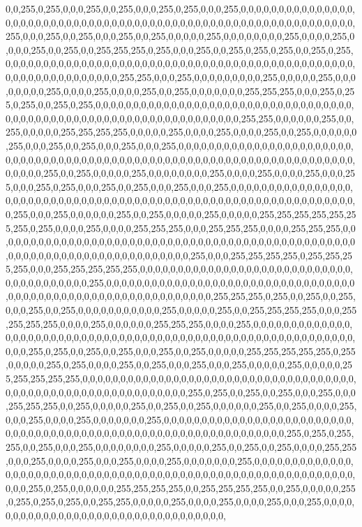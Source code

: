 0,0,255,0,255,0,0,0,255,0,0,255,0,0,0,255,0,255,0,0,0,255,0,0,0,0,0,0,0,0,0,0,0,0,0,0,0,0,0,0,0,0,0,0,0,0,0,0,0,0,0,0,0,0,0,0,0,0,0,0,0,0,0,0,0,0,0,0,0,0,0,0,0,0,0,0,0,0,0,0,0,0,0,255,0,0,0,255,0,0,255,0,0,0,255,0,0,255,0,0,0,0,0,255,0,0,0,0,0,0,0,0,255,0,0,0,0,255,0,0,0,0,255,0,0,255,0,0,255,255,255,0,255,0,0,0,255,0,0,255,0,255,0,255,0,0,255,0,255,0,0,0,0,0,0,0,0,0,0,0,0,0,0,0,0,0,0,0,0,0,0,0,0,0,0,0,0,0,0,0,0,0,0,0,0,0,0,0,0,0,0,0,0,0,0,0,0,0,0,0,0,0,0,0,0,0,0,0,0,0,255,255,0,0,0,255,0,0,0,0,0,0,0,0,0,255,0,0,0,0,0,255,0,0,0,0,0,0,0,0,255,0,0,0,0,255,0,0,0,0,255,0,0,255,0,0,0,0,0,0,0,255,255,255,0,0,0,255,0,255,0,255,0,0,255,0,255,0,0,0,0,0,0,0,0,0,0,0,0,0,0,0,0,0,0,0,0,0,0,0,0,0,0,0,0,0,0,0,0,0,0,0,0,0,0,0,0,0,0,0,0,0,0,0,0,0,0,0,0,0,0,0,0,0,0,0,0,0,0,0,0,0,255,255,0,0,0,0,0,0,255,0,0,255,0,0,0,0,0,255,255,255,255,0,0,0,0,0,255,0,0,0,0,255,0,0,0,0,255,0,0,255,0,0,0,0,0,0,255,0,0,0,255,0,0,255,0,0,0,255,0,0,0,255,0,0,0,0,0,0,0,0,0,0,0,0,0,0,0,0,0,0,0,0,0,0,0,0,0,0,0,0,0,0,0,0,0,0,0,0,0,0,0,0,0,0,0,0,0,0,0,0,0,0,0,0,0,0,0,0,0,0,0,0,0,0,0,0,0,0,0,0,0,0,0,0,0,0,255,0,0,255,0,0,0,0,0,255,0,0,0,0,0,0,0,0,255,0,0,0,0,255,0,0,0,0,255,0,0,0,255,0,0,0,255,0,255,0,0,0,255,0,0,255,0,0,0,255,0,0,0,255,0,0,0,0,0,0,0,0,0,0,0,0,0,0,0,0,0,0,0,0,0,0,0,0,0,0,0,0,0,0,0,0,0,0,0,0,0,0,0,0,0,0,0,0,0,0,0,0,0,0,0,0,0,0,0,0,0,0,0,0,0,0,0,255,0,0,0,255,0,0,0,0,0,0,255,0,0,255,0,0,0,0,0,255,0,0,0,0,0,255,255,255,255,255,255,255,0,255,0,0,0,0,255,0,0,0,0,255,255,255,0,0,0,255,255,255,0,0,0,0,255,255,255,0,0,0,0,0,0,0,0,0,0,0,0,0,0,0,0,0,0,0,0,0,0,0,0,0,0,0,0,0,0,0,0,0,0,0,0,0,0,0,0,0,0,0,0,0,0,0,0,0,0,0,0,0,0,0,0,0,0,0,0,0,0,0,0,0,0,0,0,0,0,0,0,255,0,0,0,255,255,255,255,0,255,255,255,255,0,0,0,255,255,255,255,255,0,0,0,0,0,0,0,0,0,0,0,0,0,0,0,0,0,0,0,0,0,0,0,0,0,0,0,0,0,0,0,0,0,0,0,0,0,0,0,255,0,0,0,0,0,0,0,0,0,0,0,0,0,0,0,0,0,0,0,0,0,0,0,0,0,0,0,0,0,0,0,0,0,0,0,0,0,0,0,0,0,0,0,0,0,0,0,0,0,0,0,0,0,0,0,0,0,0,0,0,255,255,255,0,255,0,0,255,0,0,255,0,0,0,255,0,0,255,0,0,0,0,0,0,0,0,0,0,0,255,0,0,0,0,0,255,0,0,255,255,255,255,0,0,0,255,255,255,255,0,0,0,0,255,0,0,0,0,0,0,255,255,255,0,0,0,0,255,0,0,0,0,0,0,0,0,0,0,0,0,0,0,0,0,0,0,0,0,0,0,0,0,0,0,0,0,0,0,0,0,0,0,0,0,0,0,0,0,0,0,0,0,0,0,0,0,0,0,0,0,0,0,0,0,0,0,0,0,0,0,255,0,255,0,0,255,0,0,255,0,0,0,255,0,0,255,0,0,0,0,0,255,255,255,255,255,0,255,0,0,0,0,0,255,0,255,0,0,0,0,255,0,0,255,0,0,0,255,0,0,0,255,0,0,0,0,0,255,0,0,0,0,0,255,255,255,255,255,0,0,0,0,0,0,0,0,0,0,0,0,0,0,0,0,0,0,0,0,0,0,0,0,0,0,0,0,0,0,0,0,0,0,0,0,0,0,0,0,0,0,0,0,0,0,0,0,0,0,0,0,0,0,0,0,0,0,0,0,255,0,255,0,0,255,0,0,255,0,0,0,255,0,0,0,255,255,255,0,0,255,0,0,0,0,0,255,0,0,255,0,0,255,0,0,0,0,0,0,255,0,0,255,0,0,0,0,255,0,0,0,255,0,0,0,0,255,0,0,0,0,0,0,0,255,0,0,0,0,0,0,0,0,0,0,0,0,0,0,0,0,0,0,0,0,0,0,0,0,0,0,0,0,0,0,0,0,0,0,0,0,0,0,0,0,0,0,0,0,0,0,0,0,0,0,0,0,0,0,0,0,0,0,0,0,0,0,255,0,255,0,255,255,0,0,255,0,0,0,255,0,0,0,0,0,0,0,0,255,0,0,0,0,0,255,0,0,255,0,0,255,0,0,0,0,255,255,0,0,0,255,0,0,0,0,255,0,0,0,255,0,0,0,0,255,0,0,0,0,0,0,0,255,0,0,0,0,0,0,0,0,0,0,0,0,0,0,0,0,0,0,0,0,0,0,0,0,0,0,0,0,0,0,0,0,0,0,0,0,0,0,0,0,0,0,0,0,0,0,0,0,0,0,0,0,0,0,0,0,0,0,0,0,0,0,255,0,255,0,0,0,0,0,0,255,255,255,255,0,0,255,255,255,255,0,0,255,0,0,0,0,0,255,0,255,0,255,0,255,0,0,255,255,0,0,0,0,0,255,0,0,0,0,255,0,0,0,0,255,0,0,0,255,0,0,0,0,0,0,0,0,0,0,0,0,0,0,0,0,0,0,0,0,0,0,0,0,0,0,0,0,0,0,0,0,0,